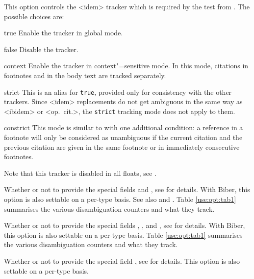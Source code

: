 \documentclass{ltxdockit}[2011/03/25]
\newcommand*{\biber}{Biber\xspace}
\begin{document}
\begin{optionlist}

This option controls the <idem> tracker which is required by the  test from . The possible choices are:

\begin{valuelist}
\item[true] Enable the tracker in global mode.
\item[false] Disable the tracker.
\item[context] Enable the tracker in context"=sensitive mode. In this mode, citations in footnotes and in the body text are tracked separately.
\item[strict] This is an alias for \texttt{true}, provided only for consistency with the other trackers. Since <idem> replacements do not get ambiguous in the same way as <ibidem> or <op.~cit.>, the \texttt{strict} tracking mode does not apply to them.
\item[constrict] This mode is similar to  with one additional condition: a reference in a footnote will only be considered as unambiguous if the current citation and the previous citation are given in the same footnote or in immediately consecutive footnotes.
\end{valuelist}

Note that this tracker is disabled in all floats, see .


Whether or not to provide the special fields  and , see  for details.
\BiberOnlyMark With \biber, this option is also settable on a per-type basis. See also  and . Table \ref{use:opt:tab1} summarises the various  disambiguation counters and what they track.


Whether or not to provide the special fields , ,  and , see  for details. 
\BiberOnlyMark With \biber, this option is also settable on a per-type basis. Table \ref{use:opt:tab1} summarises the various  disambiguation counters and what they track.


Whether or not to provide the special field , see  for details.
This option is also settable on a per-type basis.


\end{optionlist}
\end{document}
